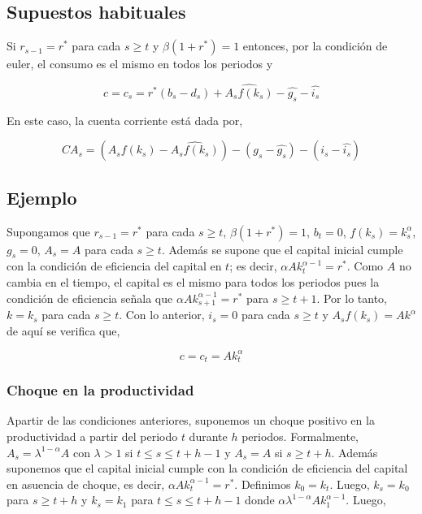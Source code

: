 \documentclass[]{article}
\begin{document}
\subsection{Supuestos habituales}\label{supuestos-habituales-2}

Si \(r_{s-1} = r^*\) para cada \(s \geq t\) y \(\beta(1 + r^*) = 1\)
entonces, por la condición de euler, el consumo es el mismo en todos los
periodos y

\[
c = c_s = r^*(b_s - d_s) + \widehat{A_sf(k_s)} - \hat{g_s} - \hat{i_s}
\]

En este caso, la cuenta corriente está dada por,

\[
CA_s = (A_sf(k_s) - \widehat{A_sf(k_s)}) - (g_s - \hat{g_s})- (i_s - \hat{i_s})
\]

\subsection{Ejemplo}\label{ejemplo-3}

Supongamos que \(r_{s-1} = r^*\) para cada \(s \geq t\),
\(\beta(1 + r^*) = 1\), \(b_t = 0\), \(f(k_s) = k_s^{\alpha}\),
\(g_s = 0\), \(A_s = A\) para cada \(s \geq t\). Además se supone que el
capital inicial cumple con la condición de eficiencia del capital en
\(t\); es decir, \(\alpha Ak_t^{\alpha-1} = r^*\). Como \(A\) no cambia
en el tiempo, el capital es el mismo para todos los periodos pues la
condición de eficiencia señala que \(\alpha Ak_{s+1}^{\alpha -1} = r^*\)
para \(s \geq t+1\). Por lo tanto, \(k = k_{s}\) para cada \(s \geq t\).
Con lo anterior, \(i_s = 0\) para cada \(s \geq t\) y
\(A_s f(k_s) = Ak^{\alpha}\) de aquí se verifica que,

\[
c = c_t = A k_t ^{\alpha}
\]

\subsubsection{Choque en la
productividad}\label{choque-en-la-productividad}

Apartir de las condiciones anteriores, suponemos un choque positivo en
la productividad a partir del periodo \(t\) durante \(h\) periodos.
Formalmente, \(A_s = \lambda^{1-\alpha}A\) con \(\lambda > 1\) si
\(t \leq s \leq t+h-1\) y \(A_s = A\) si \(s \geq t+h\). Además
suponemos que el capital inicial cumple con la condición de eficiencia
del capital en asuencia de choque, es decir,
\(\alpha Ak_t^{\alpha-1} = r^*\). Definimos \(k_0 = k_t\). Luego,
\(k_s = k_0\) para \(s \geq t+h\) y \(k_s = k_1\) para
\(t \leq s \leq t+h-1\) donde
\(\alpha \lambda^{1-\alpha}Ak_1^{\alpha-1}\). Luego,
\end{document}
